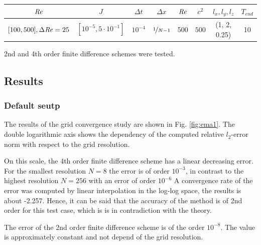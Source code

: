 \begin{center}
\vspace*{0.7ex}
\begin{tabular}{c|c|c|c|c|c|c|c }
 $ \mbox{\textit{Re}}  $                      & $J$ &  $\Delta t$ & $\Delta x$            & $\mbox{\textit{Re}}$  & $c^2$   & $l_x, l_y, l_z$ & $T_{end}$\\
\hline
 $[100, 500], \Delta \mbox{\textit{Re}} = 25 $& $[10^{-5}, 5\cdot10^{-1}]  $ &  $10^{-4}$ & $\nicefrac{1}{N - 1}$ & 500     & $500$   & (1, 2, 0.25)  & 10\\
\end{tabular}
\vspace*{0.7ex}
\end{center}

2nd and 4th order finite difference schemes were tested.

\clearpage

\subsection{Results}
\subsubsection{Default seutp}

The results of the grid convergence study are shown in Fig. \ref{fig:ema1}.
The double logarithmic axis shows the dependency of the computed relative $l_2$-error norm
with respect to the grid resolution.

On this scale, the 4th order finite difference scheme has a linear decreasing error.
For the smallest resolution $N=8$ the error is of order $10^{-3}$,
in contrast to the highest resolution $N=256$ with an error of order $10^{-6}$
A convergence rate of the error  was computed by linear interpolation in the log-log space,
the results is about -2.257.
Hence, it can be said that the accuracy of the method is of 2nd order for this test case,
which is is in contradiction with the theory.

The error of the 2nd order finite difference scheme is of the order $10^{-8}$.
The value is approximately constant and not depend of the grid resolution.

